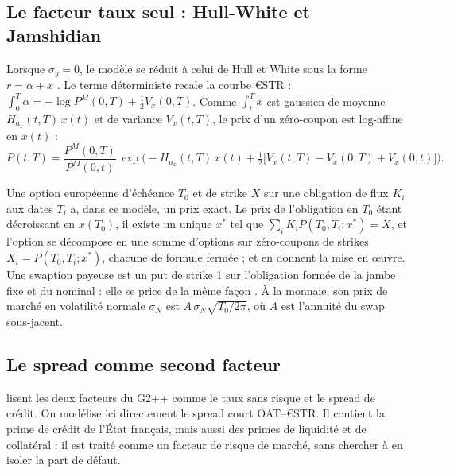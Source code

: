 \subsection{Le facteur taux seul : Hull-White et Jamshidian}

Lorsque $\sigma_y = 0$, le modèle se réduit à celui de Hull et White sous la forme $r = \alpha + x$
\citep[section~3.3]{BrigoMercurio2006}. Le terme déterministe recale la courbe €STR :
$\int_0^T \alpha = -\log P^M(0,T) + \tfrac12 V_x(0,T)$. Comme $\int_t^T x$ est gaussien de moyenne
$H_{a_x}(t,T)\,x(t)$ et de variance $V_x(t,T)$, le prix d'un zéro-coupon est log-affine en $x(t)$
\citep[éq.~3.39]{BrigoMercurio2006} :
\begin{equation}
P(t,T) = \frac{P^M(0,T)}{P^M(0,t)}\,\exp\Big(-H_{a_x}(t,T)\,x(t) + \tfrac12\big[V_x(t,T) - V_x(0,T) + V_x(0,t)\big]\Big).
\label{eq:zc_hw}
\end{equation}

Une option européenne d'échéance $T_0$ et de strike $X$ sur une obligation de flux $K_i$ aux dates $T_i$ a, dans
ce modèle, un prix exact. Le prix de l'obligation en $T_0$ étant décroissant en $x(T_0)$, il existe un unique
$x^\ast$ tel que $\sum_i K_i P(T_0,T_i;x^\ast) = X$, et l'option se décompose en une somme d'options sur
zéro-coupons de strikes $X_i = P(T_0,T_i;x^\ast)$, chacune de formule fermée \citep{Jamshidian1989} ;
\citet[section~3.11.1]{BrigoMercurio2006} et \citet[section~6.3.6]{Chaix2021} en donnent la mise en œuvre. Une
swaption payeuse est un put de strike 1 sur l'obligation formée de la jambe fixe et du nominal : elle se price de
la même façon \citep[éq.~3.44-3.46]{BrigoMercurio2006}. À la monnaie, son prix de marché en volatilité normale
$\sigma_N$ est $A\,\sigma_N\sqrt{T_0/2\pi}$, où $A$ est l'annuité du swap sous-jacent.

\subsection{Le spread comme second facteur}

\citet{Russo} lisent les deux facteurs du G2++ comme le taux sans risque et le spread de crédit. On modélise ici
directement le spread court OAT–€STR. Il contient la prime de crédit de l'État français, mais aussi des primes de
liquidité et de collatéral : il est traité comme un facteur de risque de marché, sans chercher à en isoler la part
de défaut.

